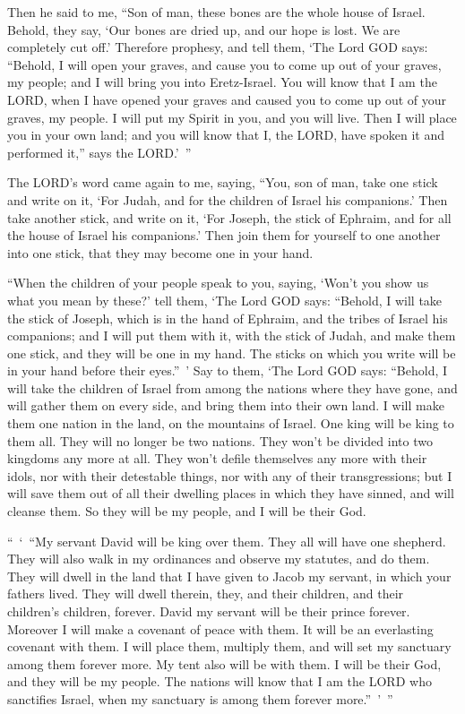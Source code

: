 \myverse{}Then he said to me, “Son of man, these bones are the whole house
of Israel. Behold, they say, ‘Our bones are dried up, and our hope is lost. We are completely cut off.’
\myverse{}Therefore prophesy, and tell them, ‘The Lord GOD says: “Behold, I will open
your graves, and cause you to come up out of your graves, my people; and I will bring you into Eretz-Israel.
\myverse{}You will know that I am the LORD, when I have opened your graves and caused
you to come up out of your graves, my people.
\myverse{}I will put my Spirit in you, and you will live. Then I will place you in
your own land; and you will know that I, the LORD, have spoken it and performed it,” says the LORD.’ ”


\vspace{\baselineskip} \myverse{}The LORD’s word came again to me, saying,
\myverse{}“You, son of man, take one stick and write on it, ‘For Judah, and for the
children of Israel his companions.’ Then take another stick, and write on it, ‘For Joseph, the stick of
Ephraim, and for all the house of Israel his companions.’
\myverse{}Then join them for yourself to one another into one stick, that they may
become one in your hand.

\myverse{}“When the children of your people speak to you, saying, ‘Won’t
you show us what you mean by these?’
\myverse{}tell them, ‘The Lord GOD says: “Behold, I will take the stick of Joseph,
which is in the hand of Ephraim, and the tribes of Israel his companions; and I will put them with it,
with the stick of Judah, and make them one stick, and they will be one in my hand.
\myverse{}The sticks on which you write will be in your hand before their eyes.” ’
\myverse{}Say to them, ‘The Lord GOD says: “Behold, I will take the children of Israel
from among the nations where they have gone, and will gather them on every side, and bring them into their
own land.
\myverse{}I will make them one nation in the land, on the mountains of Israel. One
king will be king to them all. They will no longer be two nations. They won’t be divided into two kingdoms
any more at all.
\myverse{}They won’t defile themselves any more with their idols, nor with their detestable
things, nor with any of their transgressions; but I will save them out of all their dwelling places in
which they have sinned, and will cleanse them. So they will be my people, and I will be their God.

\myverse{}“ ‘ “My servant David will be king over them. They all will have
one shepherd. They will also walk in my ordinances and observe my statutes, and do them.
\myverse{}They will dwell in the land that I have given to Jacob my servant, in which
your fathers lived. They will dwell therein, they, and their children, and their children’s children,
forever. David my servant will be their prince forever.
\myverse{}Moreover I will make a covenant of peace with them. It will be an everlasting
covenant with them. I will place them, multiply them, and will set my sanctuary among them forever more.
\myverse{}My tent also will be with them. I will be their God, and they will be my
people.
\myverse{}The nations will know that I am the LORD who sanctifies Israel, when my sanctuary
is among them forever more.” ’ ”


